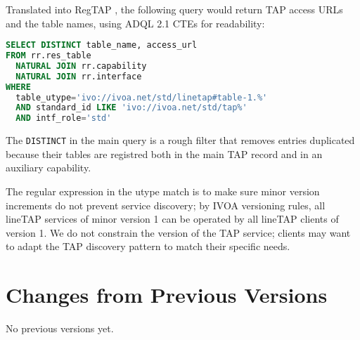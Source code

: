 \documentclass[11pt,a4paper]{ivoa}
\begin{document}
Translated into RegTAP \citep{2019ivoa.spec.1011D}, the following query
would return TAP access URLs and the table names, using ADQL 2.1 CTEs
for readability:

\begin{lstlisting}[language=SQL]
SELECT DISTINCT table_name, access_url
FROM rr.res_table
  NATURAL JOIN rr.capability
  NATURAL JOIN rr.interface
WHERE
  table_utype='ivo://ivoa.net/std/linetap#table-1.%'
  AND standard_id LIKE 'ivo://ivoa.net/std/tap%'
  AND intf_role='std'
\end{lstlisting}

The \texttt{DISTINCT} in the main query is a rough filter that removes
entries duplicated because their tables are registred both in the main
TAP record and in an auxiliary capability.  

The regular expression in the utype match is to make sure minor version
increments do not prevent service discovery; by IVOA versioning rules,
all lineTAP services of minor version 1 can be operated by all lineTAP
clients of version 1.  We do not constrain the version of the TAP
service; clients may want to adapt the TAP discovery pattern to match
their specific needs.



\appendix
\section{Changes from Previous Versions}

No previous versions yet.



\end{document}
